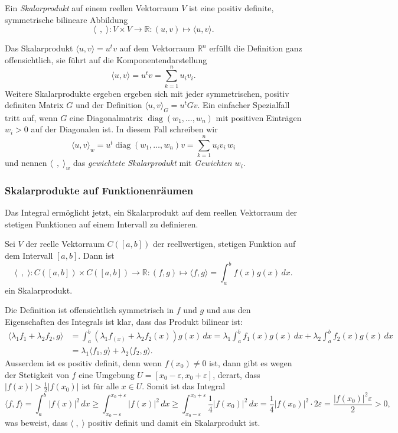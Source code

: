 \begin{definition}
Ein {\em Skalarprodukt} auf einem reellen Vektorraum $V$ ist eine
positiv definite, symmetrische bilineare Abbildung
\[
\langle\;\,,\;\rangle
\colon
V\times V
\to
\mathbb{R}
:
(u,v) \mapsto \langle u,v\rangle.
\]
\end{definition}

Das Skalarprodukt $\langle u,v\rangle=u^tv$ auf dem Vektorraum 
$\mathbb{R}^n$ erfüllt die Definition ganz offensichtlich,
sie führt auf die Komponentendarstellung
\[
\langle u,v\rangle = u^tv = \sum_{k=1}^n u_iv_i.
\]
Weitere Skalarprodukte ergeben ergeben sich mit jeder symmetrischen,
positiv definiten Matrix $G$ und der Definition
$\langle u,v\rangle_G=u^tGv$.
Ein einfacher Spezialfall tritt auf, wenn $G$ eine Diagonalmatrix
$\operatorname{diag}(w_1,\dots,w_n)$
mit positiven Einträgen $w_i>0$ auf der Diagonalen ist.
In diesem Fall schreiben wir
\[
\langle u,v\rangle_w
=
u^t\operatorname{diag}(w_1,\dots,w_n)v
=
\sum_{k=1}^n u_iv_i\,w_i
\]
und nennen $\langle \;\,,\;\rangle_w$ das {\em gewichtete Skalarprodukt}
mit {\em Gewichten $w_i$}.

\subsubsection{Skalarprodukte auf Funktionenräumen}
Das Integral ermöglicht jetzt, ein Skalarprodukt auf dem reellen
Vektorraum der stetigen Funktionen auf einem Intervall zu definieren.

\begin{definition}
\label{buch:orthogonal:def:skalarprodukt}
Sei $V$ der reelle Vektorraum $C([a,b])$ der reellwertigen, stetigen
Funktion auf dem Intervall $[a,b]$.
Dann ist 
\[
\langle\;\,,\;\rangle
\colon
C([a,b]) \times C([a,b]) \to \mathbb{R}
:
(f,g) \mapsto \langle f,g\rangle = \int_a^b f(x)g(x)\,dx.
\]
ein Skalarprodukt.
\end{definition}

Die Definition ist offensichtlich symmetrisch in $f$ und $g$ und
aus den Eigenschaften des Integrals ist klar, dass das Produkt
bilinear ist:
\begin{align*}
\langle \lambda_1 f_1+\lambda_2f_2,g\rangle
&=
\int_a^b (\lambda_1f_(x) +\lambda_2f_2(x))g(x)\,dx
=
\lambda_1\int_a^b f_1(x) g(x)\,dx
+
\lambda_2\int_a^b f_2(x) g(x)\,dx
\\
&=
\lambda_1\langle f_1,g\rangle
+
\lambda_2\langle f_2,g\rangle.
\end{align*}
Ausserdem ist es positiv definit, denn wenn $f(x_0) \ne 0$ ist,
dann gibt es wegen der Stetigkeit von $f$ eine Umgebung
$U=[x_0-\varepsilon,x_0+\varepsilon]$, derart, dass $|f(x)| > \frac12|f(x_0)|$
ist für alle $x\in U$.
Somit ist das Integral
\[
\langle f,f\rangle
=
\int_a^b |f(x)|^2\,dx
\ge
\int_{x_0-\varepsilon}^{x_0+\varepsilon} |f(x)|^2\,dx
\ge
\int_{x_0-\varepsilon}^{x_0+\varepsilon} \frac14|f(x_0)|^2\,dx
=
\frac{1}{4}|f(x_0)|^2\cdot 2\varepsilon
=
\frac{|f(x_0)|^2\varepsilon}{2}
>0,
\]
was beweist, dass $\langle\;,\;\rangle$ positiv definit und damit
ein Skalarprodukt ist.

